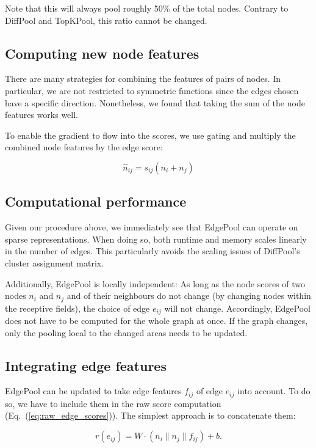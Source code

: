 \documentclass{article}
\newcommand{\equationref}[1]{Eq.~(\ref{#1})}
\newcommand{\edgepool}{EdgePool}
\newcommand{\concatenate}{\|}
\begin{document}
Note that this will always pool roughly 50\% of the total nodes. Contrary to DiffPool and TopKPool, this ratio cannot be changed.

\subsection{Computing new node features}

There are many strategies for combining the features of pairs of nodes. In particular, we are not restricted  to symmetric functions since the edges chosen have a specific direction. Nonetheless, we found that taking the sum of the node features works well.

To enable the gradient to flow into the scores, we use gating and multiply the combined node features by the edge score:

\begin{equation}
	\hat{n}_{ij} = s_{ij} \left( n_i + n_j\right)
\end{equation}


\subsection{Computational performance}
Given our procedure above, we immediately see that \edgepool{} can operate on sparse representations. When doing so, both runtime and memory scales linearly in the number of edges. This particularly avoids the scaling issues of DiffPool's cluster assignment matrix.

Additionally, \edgepool{} is locally independent: As long as the node scores of two nodes $n_i$ and $n_j$ and of their neighbours do not change (by changing nodes within the receptive fields), the choice of edge $e_{ij}$ will not change. Accordingly, \edgepool{} does not have to be computed for the whole graph at once. If the graph changes, only the pooling local to the changed areas needs to be updated.


\subsection{Integrating edge features}

\edgepool{} can be updated to take edge features $f_{ij}$ of edge $e_{ij}$ into account. To do so, we have to include them in the raw score computation (\equationref{eq:raw_edge_scores}). The simplest approach is to concatenate them:

\begin{equation}
r(e_{ij}) = W \cdot  (n_i \concatenate n_j \concatenate f_{ij}) + b.
\end{equation}
\end{document}
